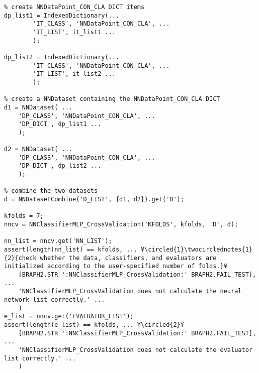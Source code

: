 \documentclass{tufte-handout}
\begin{document}
\begin{lstlisting}
% create NNDataPoint_CON_CLA DICT items
dp_list1 = IndexedDictionary(...
        'IT_CLASS', 'NNDataPoint_CON_CLA', ...
        'IT_LIST', it_list1 ...
        );

dp_list2 = IndexedDictionary(...
        'IT_CLASS', 'NNDataPoint_CON_CLA', ...
        'IT_LIST', it_list2 ...
        );

% create a NNDataset containing the NNDataPoint_CON_CLA DICT
d1 = NNDataset( ...
    'DP_CLASS', 'NNDataPoint_CON_CLA', ...
    'DP_DICT', dp_list1 ...
    );

d2 = NNDataset( ...
    'DP_CLASS', 'NNDataPoint_CON_CLA', ...
    'DP_DICT', dp_list2 ...
    );

% combine the two datasets
d = NNDatasetCombine('D_LIST', {d1, d2}).get('D');

kfolds = 7;
nncv = NNClassifierMLP_CrossValidation('KFOLDS', kfolds, 'D', d);

nn_list = nncv.get('NN_LIST');
assert(length(nn_list) == kfolds, ... ¥\circled{1}\twocirclednotes{1}{2}{check whether the data, classifiers, and evaluators are initialized according to the user-specified number of folds.}¥
    [BRAPH2.STR ':NNClassifierMLP_CrossValidation:' BRAPH2.FAIL_TEST], ...
    'NNClassifierMLP_CrossValidation does not calculate the neural network list correctly.' ...
    )
e_list = nncv.get('EVALUATOR_LIST');
assert(length(e_list) == kfolds, ... ¥\circled{2}¥
    [BRAPH2.STR ':NNClassifierMLP_CrossValidation:' BRAPH2.FAIL_TEST], ...
    'NNClassifierMLP_CrossValidation does not calculate the evaluator list correctly.' ...
    )

\end{lstlisting}

%
%
\end{document}
